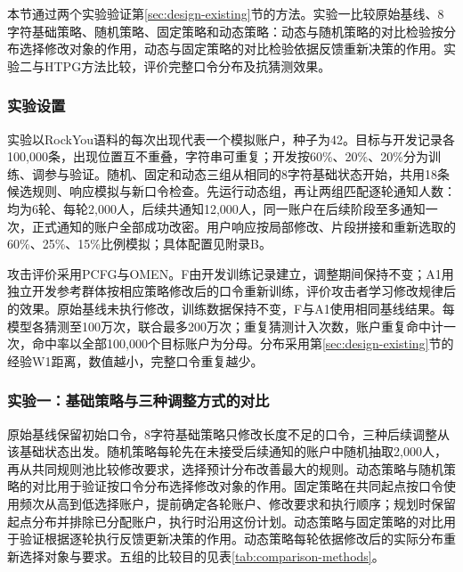 \documentclass{crypto_report}
\begin{document}
本节通过两个实验验证第\ref{sec:design-existing}节的方法。实验一比较原始基线、8字符基础策略、随机策略、固定策略和动态策略：动态与随机策略的对比检验按分布选择修改对象的作用，动态与固定策略的对比检验依据反馈重新决策的作用。实验二与HTPG方法比较，评价完整口令分布及抗猜测效果。

\subsubsection{实验设置}\label{sec:validation-existing-1}

实验以RockYou语料的每次出现代表一个模拟账户，种子为42。目标与开发记录各100,000条，出现位置互不重叠，字符串可重复；开发按60\%、20\%、20\%分为训练、调参与验证。随机、固定和动态三组从相同的8字符基础状态开始，共用18条候选规则、响应模拟与新口令检查。先运行动态组，再让两组匹配逐轮通知人数：均为6轮、每轮2,000人，后续共通知12,000人，同一账户在后续阶段至多通知一次，正式通知的账户全部成功改密。用户响应按局部修改、片段拼接和重新选取的60\%、25\%、15\%比例模拟；具体配置见附录B。

攻击评价采用PCFG与OMEN。F由开发训练记录建立，调整期间保持不变；A1用独立开发参考群体按相应策略修改后的口令重新训练，评价攻击者学习修改规律后的效果。原始基线未执行修改，训练数据保持不变，F与A1使用相同基线结果。每模型各猜测至100万次，联合最多200万次；重复猜测计入次数，账户重复命中计一次，命中率以全部100,000个目标账户为分母。分布采用第\ref{sec:design-existing}节的经验W1距离，数值越小，完整口令重复越少。

\subsubsection{实验一：基础策略与三种调整方式的对比}\label{sec:validation-existing-2}

原始基线保留初始口令，8字符基础策略只修改长度不足的口令，三种后续调整从该基础状态出发。随机策略每轮先在未接受后续通知的账户中随机抽取2,000人，再从共同规则池比较修改要求，选择预计分布改善最大的规则。动态策略与随机策略的对比用于验证按口令分布选择修改对象的作用。固定策略在共同起点按口令使用频次从高到低选择账户，提前确定各轮账户、修改要求和执行顺序；规划时保留起点分布并排除已分配账户，执行时沿用这份计划。动态策略与固定策略的对比用于验证根据逐轮执行反馈更新决策的作用。动态策略每轮依据修改后的实际分布重新选择对象与要求。五组的比较目的见表\ref{tab:comparison-methods}。
\end{document}
